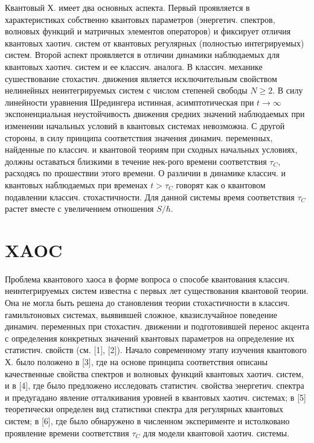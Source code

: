 \documentclass[10pt]{article}
\begin{document}
Квантовый Х. имеет два основных аспекта. Первый проявляется в характеристиках собственно квантовых параметров (энергетич. спектров, волновых функций и матричных элементов операторов) и фиксирует отличия квантовых хаотич. систем от квантовых регулярных (полностью интегрируемых) систем. Второй аспект проявляется в отличии динамики наблюдаемых для квантовых хаотич. систем и ее классич. аналога. В классич. механике сушествование стохастич. движения является исключительным свойством нелинейных неинтегрируемых систем с числом степеней свободы $N \geqslant 2$. В силу линейности уравнения Шредингера истинная, асимптотическая при $t \rightarrow \infty$ экспоненциальная неустойчивость движения средних значений наблюдаемых при изменении начальных условий в квантовых системах невозможна. С другой стороны, в силу принципа соответствия значения динамич. переменных, найденные по классич. и квантовой теориям при сходных начальных условиях, должны оставаться близкими в течение нек-рого времени соответствия $\tau_{C}$, расходясь по прошествии этого времени. О различии в динамике классич. и квантовых наблюдаемых при временах $t>\tau_{C}$ говорят как о квантовом подавлении классич. стохастичности. Для данной системы время соответствия $\tau_{C}$ растет вместе с увеличением отношения $S / \hbar$.



\section{XAOC}

Проблема квантового хаоса в форме вопроса о способе квантования классич. неинтегрируемых систем известна с первых лет существования квантовой теории. Она не могла быть решена до становления теории стохастичности в классич. гамильтоновых системах, выявившей сложное, квазислучайное поведение динамич. переменных при стохастич. движении и подготовившей перенос акцента с определения конкретных значений квантовых параметров на определение их статистич. свойств (см. [1], [2]). Начало современному этапу изучения квантового Х. было положено в [3], где на основе принципа соответствия описаны качественные свойства спектров и волновых функций квантовых хаотич. систем, и в [4], где было предложено исследовать статистич. свойства энергетич. спектра и предугадано явление отталкивания уровней в квантовых хаотич. системах; в [5] теоретически определен вид статистики спектра для регулярных квантовых систем; в [6], где было обнаружено в численном эксперименте и истолковано проявление времени соответствия $\tau_{C}$ для модели квантовой хаотич. системы.
\end{document}
